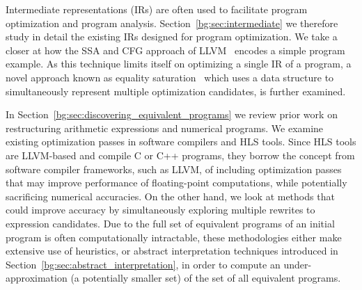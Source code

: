 Intermediate representations (IRs) are often used to facilitate program
optimization and program analysis.  Section~\ref{bg:sec:intermediate} we
therefore study in detail the existing IRs designed for program optimization.
We take a closer at how the SSA and CFG approach of LLVM~\cite{llvm_ir}
encodes a simple program example.  As this technique limits itself on
optimizing a single IR of a program, a novel approach known as equality
saturation~\cite{tate09} which uses a data structure to simultaneously
represent multiple optimization candidates, is further examined.

In Section~\ref{bg:sec:discovering_equivalent_programs} we review prior work
on restructuring arithmetic expressions and numerical programs.  We examine
existing optimization passes in software compilers and HLS tools.  Since HLS
tools are LLVM-based and compile C or C++ programs, they borrow the concept
from software compiler frameworks, such as LLVM, of including optimization
passes that may improve performance of floating-point computations, while
potentially sacrificing numerical accuracies.  On the other hand, we look
at methods that could improve accuracy by simultaneously exploring multiple
rewrites to expression candidates.  Due to the full set of equivalent programs
of an initial program is often computationally intractable, these methodologies
either make extensive use of heuristics, or abstract interpretation techniques
introduced in Section~\ref{bg:sec:abstract_interpretation}, in order to compute
an under-approximation (a potentially smaller set) of the set of all equivalent
programs.

